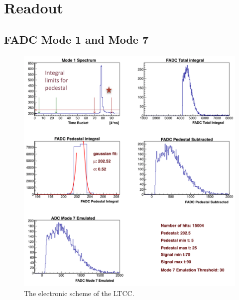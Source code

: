 \section{Readout}

\subsection{FADC Mode 1 and Mode 7}


\begin{figure}
	\centering
	\includegraphics[width=0.95\columnwidth,keepaspectratio]{img/readout.png}
	\caption{The electronic scheme of the LTCC.}
	\label{fig:readout}
\end{figure}
